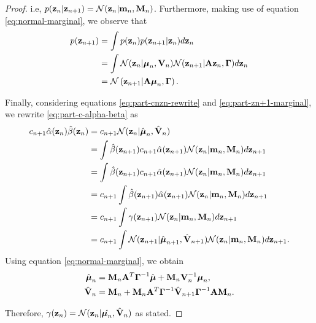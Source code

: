 \documentclass[11pt]{article}
\numberwithin{equation}{section}
\newcommand{\z}{{\bf z}}
\newcommand{\N}{\mathcal{N}}
\begin{document}
\begin{proof}
	i.e, $p(\z_n \vert \z_{n+1}) = \N(\z_n \vert {\bf m}_n, {\bf M}_n)$. Furthermore, making use of equation \eqref{eq:normal-marginal}, we observe that
	\begin{align}
		p(\z_{n+1}) &= \int p(\z_n) p(\z_{n+1} \vert \z_n) d\z_n\\
					&= \int \N(\z_n \vert\boldsymbol\mu_n, {\bf V}_n) \N(\z_{n+1} \vert {\bf A}\z_n, \boldsymbol\Gamma) d\z_n\\
					&= \N\left(\z_{n+1} \vert {\bf A}\boldsymbol\mu_n, \boldsymbol\Gamma\right) \label{eq:part-zn+1-marginal}.
	\end{align}
	
	Finally, considering equations \eqref{eq:part-cnzn-rewrite} and \eqref{eq:part-zn+1-marginal}, we rewrite \eqref{eq:part-c-alpha-beta} as
	\begin{align}
		c_{n+1}\hat\alpha(\z_n)\hat\beta(\z_n) &= c_{n+1} \N(\z_{n} \vert \hat{\boldsymbol\mu}_n, \hat{\bf V}_n)\\
		&= \int \hat\beta(\z_{n+1}) c_{n+1} \hat\alpha(\z_{n+1})\N(\z_n \vert {\bf m}_n, {\bf M}_n) d\z_{n+1}\\
		&= \int \hat\beta(\z_{n+1}) c_{n+1} \hat\alpha(\z_{n+1})\N(\z_n \vert {\bf m}_n, {\bf M}_n)d\z_{n+1}\\
		&= c_{n+1}\int \hat\beta(\z_{n+1}) \hat\alpha(\z_{n+1})\N(\z_n \vert {\bf m}_n, {\bf M}_n)d\z_{n+1}\\
		&= c_{n+1}\int \gamma(\z_{n+1})\N(\z_n \vert {\bf m}_n, {\bf M}_n) d\z_{n+1}\\
		&= c_{n+1}\int \N(\z_{n+1} \vert \hat{\boldsymbol\mu}_{n+1}, \hat{\bf V}_{n+1})\N(\z_n \vert {\bf m}_n, {\bf M}_n)d\z_{n+1}.\\
	\end{align}
	Using equation \eqref{eq:normal-marginal}, we obtain
	\begin{align}
		\hat{\boldsymbol{\mu}}_n &= {\bf M}_n {\bf A}^T \boldsymbol\Gamma ^{-1} \hat{\boldsymbol{\mu}} + {\bf M}_n {\bf V}_n^{-1} \boldsymbol\mu_n \label{eq:part-muhat-1},\\
		\hat{{\bf V}}_n&= {\bf M}_n + {\bf M}_n {\bf A}^T \boldsymbol{\Gamma}^{-1} \hat{\bf V}_{n+1}\boldsymbol\Gamma^{-1}{\bf A}{\bf M}_n \label{eq:part-Vhat-1}.
	\end{align}
	
	Therefore, $\gamma(\z_n) = \N(\z_n \vert \hat{\boldsymbol{\mu}_n}, \hat {\bf V}_n)$ as stated. 
	

\end{proof}
\end{document}
